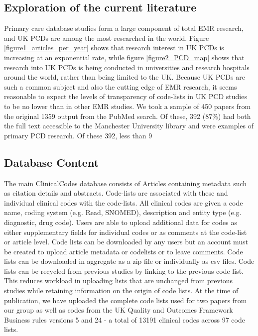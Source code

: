 \documentclass[10pt]{article}
\begin{document}
\subsection*{Exploration of the current literature}

Primary care database studies form a large component of total EMR research, and UK PCDs are among the most researched in the world.  Figure \ref{figure1_articles_per_year} shows that research interest in UK PCDs is increasing at an exponential rate, while figure \ref{figure2_PCD_map} shows that research into UK PCDs is being conducted in universities and research hospitals around the world, rather than being limited to the UK.  Because UK PCDs are such a common subject and also the cutting edge  of EMR research, it seems reasonable to expect the levels of transparency of code-lists in UK PCD studies to be no lower than in other EMR studies.  We took a sample of 450 papers from the original 1359 output from the PubMed search.  Of these, 392 (87\%) had both  the full text accessible to the Manchester University library and were examples of primary PCD research.  Of these 392, less than 9%


\subsection*{Database Content}

The main ClinicalCodes database consists of Articles containing metadata such as citation details and abstracts.  Code-lists are associated with these and individual clinical codes with the code-lists. All clinical codes are given a code name, coding system (e.g. Read, SNOMED), description and entity type (e.g. diagnostic, drug code).  Users are able to upload additional data for codes as either supplementary fields for individual codes or as comments at the code-list or article level.  Code lists can be downloaded by any users but an account must be created to upload article metadata or codelists or to leave comments. Code lists can be downloaded in aggregate as a zip file or individually as csv files.  Code lists can be recycled from previous studies by linking to the previous code list.  This reduces workload in uploading lists that are unchanged from previous studies while retaining information on the origin of code lists.  At the time of publication, we have uploaded the complete code lists used for two papers from our group \cite{Doran2011, Kontopantelis2014} as well as codes from the UK Quality and Outcomes Framework Business rules versions 5 and 24 - a total of 13191 clinical codes across 97 code lists.
\end{document}
